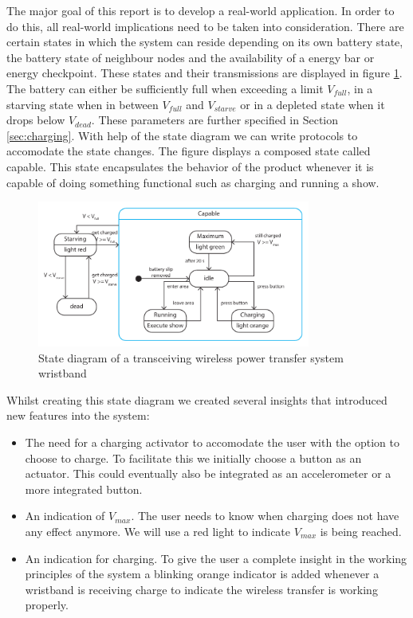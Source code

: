 %
The major goal of this report is to develop a real-world application. In order to do this, all real-world implications need to be taken into consideration. There are certain states in which the system can reside depending on its own battery state, the battery state of neighbour nodes and the availability of a energy bar or energy checkpoint. These states and their transmissions are displayed in figure \ref{fig:states}. The battery can either be sufficiently full when exceeding a limit $V_{full}$, in a starving state when in between $V_{full}$ and $V_{starve}$ or in a depleted state when it drops below $V_{dead}$. These parameters are further specified in Section \ref{sec:charging}. With help of the state diagram we can write protocols to accomodate the state changes. The figure displays a composed state called capable. This state encapsulates the behavior of the product whenever it is capable of doing something functional such as charging and running a show. 

\begin{figure}[h!]
\centering
\includegraphics[width=0.8\textwidth]{statediagram.pdf}
\caption{State diagram of a transceiving wireless power transfer system wristband}
\label{fig:states}
\end{figure}

Whilst creating this state diagram we created several insights that introduced new features into the system:
\begin{itemize}
	\item The need for a charging activator to accomodate the user with the option to choose to charge. To facilitate this we initially choose a button as an actuator. This could eventually also be integrated as an accelerometer or a more integrated button. 
	\item An indication of $V_{max}$. The user needs to know when charging does not have any effect anymore. We will use a red light to indicate $V_{max}$ is being reached. 
	\item An indication for charging. To give the user a complete insight in the working principles of the system a blinking orange indicator is added whenever a wristband is receiving charge to indicate the wireless transfer is working properly. 
\end{itemize}

